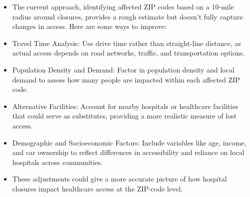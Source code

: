 \documentclass[
  letterpaper,
  DIV=11,
  numbers=noendperiod]{scrartcl}
\providecommand{\tightlist}{%
  \setlength{\itemsep}{0pt}\setlength{\parskip}{0pt}}\usepackage{longtable,booktabs,array}
\begin{document}
\begin{itemize}
\tightlist
\item
  The current approach, identifying affected ZIP codes based on a
  10-mile radius around closures, provides a rough estimate but doesn't
  fully capture changes in access. Here are some ways to improve:
\item
  Travel Time Analysis: Use drive time rather than straight-line
  distance, as actual access depends on road networks, traffic, and
  transportation options.
\item
  Population Density and Demand: Factor in population density and local
  demand to assess how many people are impacted within each affected ZIP
  code.
\item
  Alternative Facilities: Account for nearby hospitals or healthcare
  facilities that could serve as substitutes, providing a more realistic
  measure of lost access.
\item
  Demographic and Socioeconomic Factors: Include variables like age,
  income, and car ownership to reflect differences in accessibility and
  reliance on local hospitals across communities.
\item
  These adjustments could give a more accurate picture of how hospital
  closures impact healthcare access at the ZIP-code level.
\end{itemize}
\end{document}
